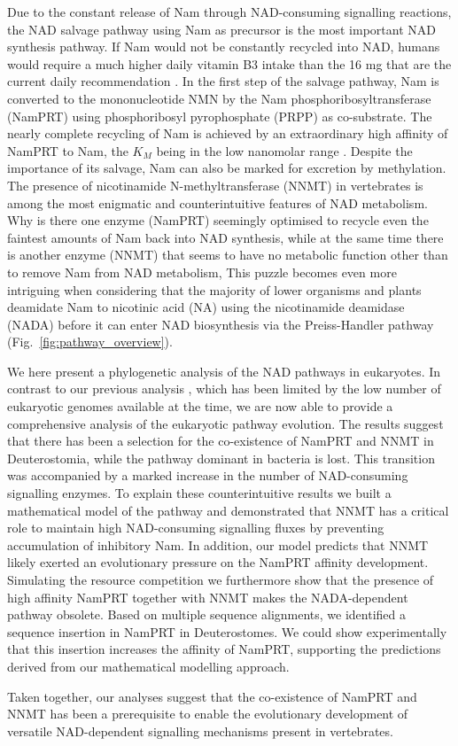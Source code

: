 Due to the constant release of Nam through NAD-consuming signalling reactions, the NAD salvage pathway using Nam as precursor is the most important NAD synthesis pathway. If Nam would not be constantly recycled into NAD, humans would require a much higher daily vitamin B3 intake than the 16 mg that are the current daily recommendation \cite{CommissionofEuropeanCommunities2008}. In the first step of the salvage pathway, Nam is converted to the mononucleotide NMN by the Nam phosphoribosyltransferase (NamPRT) using phosphoribosyl pyrophosphate (PRPP) as co-substrate. The nearly complete recycling of Nam is achieved by an extraordinary high affinity of NamPRT to Nam, the $K_{M}$ being in the low nanomolar range \cite{Burgos2008}. Despite the importance of its salvage, Nam can also be marked for excretion by methylation. The presence of nicotinamide N-methyltransferase (NNMT) in vertebrates \cite{Gossmann2012FEBS} is among the most enigmatic and counterintuitive features of NAD metabolism. Why is there one enzyme (NamPRT) seemingly optimised to recycle even the faintest amounts of Nam back into NAD synthesis, while at the same time there is another enzyme (NNMT) that seems to have no metabolic function other than to remove Nam from NAD metabolism, This puzzle becomes even more intriguing when considering that the majority of lower organisms and plants deamidate Nam to nicotinic acid (NA) using the nicotinamide deamidase (NADA) before it can enter NAD biosynthesis via the Preiss-Handler pathway (Fig.~\ref{fig:pathway_overview}).

We here present a phylogenetic analysis of the NAD pathways in eukaryotes. In contrast to our previous analysis \cite{Gossmann2012FEBS}, which has been limited by the low number of eukaryotic genomes available at the time, we are now able to provide a comprehensive analysis of the eukaryotic pathway evolution. The results suggest that there has been a selection for the co-existence of NamPRT and NNMT in Deuterostomia, while the pathway dominant in bacteria is lost. This transition was accompanied by a marked increase in the number of NAD-consuming signalling enzymes. To explain these counterintuitive results we built a mathematical model of the pathway and demonstrated that NNMT has a critical role to maintain high NAD-consuming signalling fluxes by preventing accumulation of inhibitory Nam. In addition, our model predicts that NNMT likely exerted an evolutionary pressure on the NamPRT affinity development. Simulating the resource competition we furthermore show that the presence of high affinity NamPRT together with NNMT makes the NADA-dependent pathway obsolete. Based on multiple sequence alignments, we identified a sequence insertion in NamPRT in Deuterostomes. We could show experimentally that this insertion increases the affinity of NamPRT, supporting the predictions derived from our mathematical modelling approach.

Taken together, our analyses suggest that the co-existence of NamPRT and NNMT has been a prerequisite to enable the evolutionary development of versatile NAD-dependent signalling mechanisms present in vertebrates.
